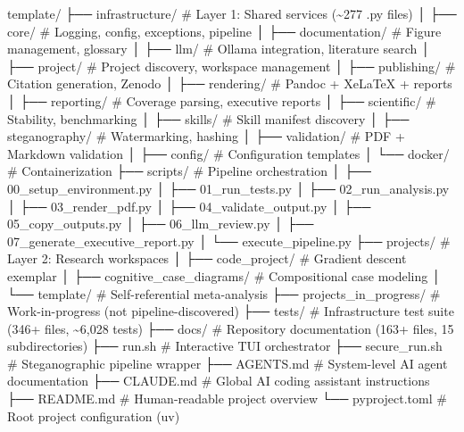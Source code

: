 \documentclass[
]{article}
\newenvironment{Shaded}{}{}
\newcommand{\NormalTok}[1]{#1}
\begin{document}
\begin{Shaded}
\begin{Highlighting}[]
\NormalTok{template/}
\NormalTok{├── infrastructure/           \# Layer 1: Shared services (\textasciitilde{}277 .py files)}
\NormalTok{│   ├── core/                 \# Logging, config, exceptions, pipeline}
\NormalTok{│   ├── documentation/        \# Figure management, glossary}
\NormalTok{│   ├── llm/                  \# Ollama integration, literature search}
\NormalTok{│   ├── project/              \# Project discovery, workspace management}
\NormalTok{│   ├── publishing/           \# Citation generation, Zenodo}
\NormalTok{│   ├── rendering/            \# Pandoc + XeLaTeX + reports}
\NormalTok{│   ├── reporting/            \# Coverage parsing, executive reports}
\NormalTok{│   ├── scientific/           \# Stability, benchmarking}
\NormalTok{│   ├── skills/               \# Skill manifest discovery}
\NormalTok{│   ├── steganography/        \# Watermarking, hashing}
\NormalTok{│   ├── validation/           \# PDF + Markdown validation}
\NormalTok{│   ├── config/               \# Configuration templates}
\NormalTok{│   └── docker/               \# Containerization}
\NormalTok{├── scripts/                  \# Pipeline orchestration}
\NormalTok{│   ├── 00\_setup\_environment.py}
\NormalTok{│   ├── 01\_run\_tests.py}
\NormalTok{│   ├── 02\_run\_analysis.py}
\NormalTok{│   ├── 03\_render\_pdf.py}
\NormalTok{│   ├── 04\_validate\_output.py}
\NormalTok{│   ├── 05\_copy\_outputs.py}
\NormalTok{│   ├── 06\_llm\_review.py}
\NormalTok{│   ├── 07\_generate\_executive\_report.py}
\NormalTok{│   └── execute\_pipeline.py}
\NormalTok{├── projects/                 \# Layer 2: Research workspaces}
\NormalTok{│   ├── code\_project/         \# Gradient descent exemplar}
\NormalTok{│   ├── cognitive\_case\_diagrams/ \# Compositional case modeling}
\NormalTok{│   └── template/             \# Self{-}referential meta{-}analysis}
\NormalTok{├── projects\_in\_progress/     \# Work{-}in{-}progress (not pipeline{-}discovered)}
\NormalTok{├── tests/                    \# Infrastructure test suite (346+ files, \textasciitilde{}6,028 tests)}
\NormalTok{├── docs/                     \# Repository documentation (163+ files, 15 subdirectories)}
\NormalTok{├── run.sh                    \# Interactive TUI orchestrator}
\NormalTok{├── secure\_run.sh             \# Steganographic pipeline wrapper}
\NormalTok{├── AGENTS.md                 \# System{-}level AI agent documentation}
\NormalTok{├── CLAUDE.md                 \# Global AI coding assistant instructions}
\NormalTok{├── README.md                 \# Human{-}readable project overview}
\NormalTok{└── pyproject.toml            \# Root project configuration (uv)}
\end{Highlighting}
\end{Shaded}
\end{document}
